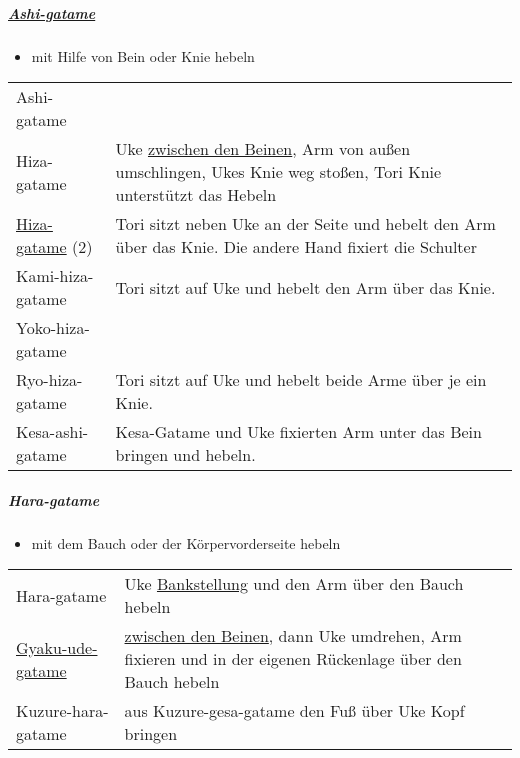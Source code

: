 \documentclass[justified, a4paper, notitlepage, captions=tableheading, nobib]{tufte-handout}
\begin{document}
\subparagraph{\hyperref[org38f5fab]{Ashi-gatame}}
\label{sec:orge3b1e7b}

\begin{itemize}
\item mit Hilfe von Bein oder Knie hebeln
\end{itemize}

\begin{center}
\begin{tabular}{ll}
\label{org38f5fab}Ashi-gatame & \\
\label{orgb18dd1d}Hiza-gatame & Uke \hyperref[orge217f65]{zwischen den Beinen}, Arm von außen umschlingen, Ukes Knie weg stoßen, Tori Knie unterstützt das Hebeln\\
\hyperref[orgb18dd1d]{Hiza-gatame} (2) & Tori sitzt neben Uke an der Seite und hebelt den Arm über das Knie. Die andere Hand fixiert die Schulter\\
\label{org54b447f}Kami-hiza-gatame & Tori sitzt auf Uke und hebelt den Arm über das Knie.\\
\label{org009f75e}Yoko-hiza-gatame & \\
\label{org08e2336}Ryo-hiza-gatame & Tori sitzt auf Uke und hebelt beide Arme über je ein Knie.\\
\label{org2d89e1a}Kesa-ashi-gatame & Kesa-Gatame und Uke fixierten Arm unter das Bein bringen und hebeln.\\
\end{tabular}
\end{center}

\subparagraph{Hara-gatame}
\label{sec:orgdb383c5}

\begin{itemize}
\item mit dem Bauch oder der Körpervorderseite hebeln
\end{itemize}

\begin{center}
\begin{tabular}{ll}
Hara-gatame & Uke \hyperref[org9811981]{Bankstellung} und den Arm über den Bauch hebeln\\
\hyperref[orga78eb6e]{Gyaku-ude-gatame} & \hyperref[orge217f65]{zwischen den Beinen}, dann Uke umdrehen, Arm fixieren und in der eigenen Rückenlage über den Bauch hebeln\\
Kuzure-hara-gatame & aus Kuzure-gesa-gatame den Fuß über Uke Kopf bringen\\
\end{tabular}
\end{center}
\end{document}
